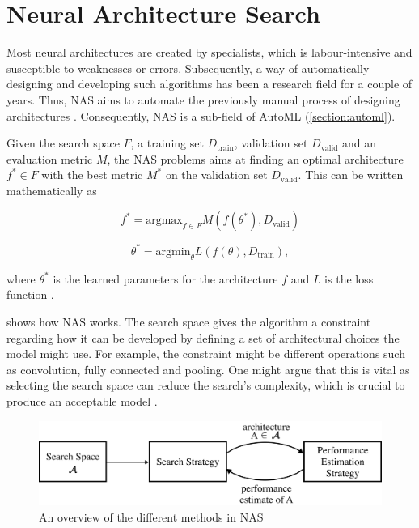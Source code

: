 \section{Neural Architecture Search} \label{section:nas}

Most neural architectures are created by specialists, which is labour-intensive and susceptible to weaknesses or errors. Subsequently, a way of automatically designing and developing such algorithms has been a research field for a couple of years. Thus, \gls{NAS} aims to automate the previously manual process of designing architectures \autocite{elsken2019neural}. Consequently, \gls{NAS} is a sub-field of \gls{AutoML} (\cref{section:automl}). 

Given the search space $F$, a training set $D_{\text{train}}$, validation set $D_{\text{valid}}$ and an evaluation metric $M$, the \gls{NAS} problems aims at finding an optimal architecture $f^* \in F$ with the best metric $M^*$ on the validation set $D_{\text{valid}}$. This can be written mathematically as 

\begin{equation*}
    f^* = \text{argmax}_{f \in F} M(f(\theta^*), D_{\text{valid}}) 
\end{equation*}

\begin{equation*}
    \theta^* = \text{argmin}_{\theta} L(f(\theta), D_{\text{train}}), 
\end{equation*}

where $\theta^*$ is the learned parameters for the architecture $f$ and $L$ is the loss function \autocite{zhou2019auto}. 




 shows how \gls{NAS} works. The search space gives the algorithm a constraint regarding how it can be developed by defining a set of architectural choices the model might use. For example, the constraint might be different operations such as convolution, fully connected and pooling. One might argue that this is vital as selecting the search space can reduce the search's complexity, which is crucial to produce an acceptable model \autocite{kyriakides2020introduction}.

\begin{figure}[h]
    \centering
    \includegraphics[width=12cm]{figures/NAS_overview.png}
    \caption{An overview of the different methods in \gls{NAS} \autocite{elsken2019neural} }
    \label{fig:nas_overview}
\end{figure}

